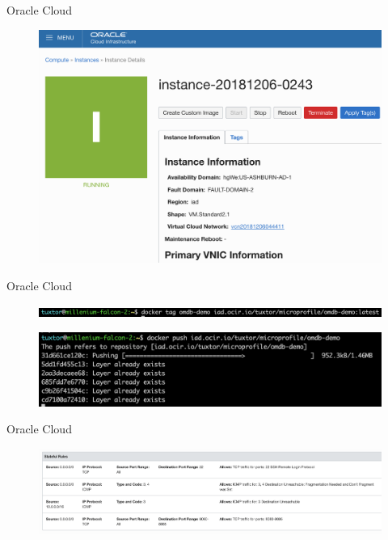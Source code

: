\documentclass{beamer}
\begin{document}
\begin{frame}{Oracle Cloud}
\begin{figure}
	\centering
	\includegraphics[width=0.95\linewidth]{Images/oc2}
\end{figure}
\end{frame}

\begin{frame}{Oracle Cloud}
\begin{figure}
	\centering
	\includegraphics[width=\linewidth]{Images/oc3}
\end{figure}

\begin{figure}
	\centering
	\includegraphics[width=\linewidth]{Images/oc4}
\end{figure}
\end{frame}

\begin{frame}{Oracle Cloud}

\begin{figure}
	\centering
	\includegraphics[width=\linewidth]{Images/oc5}
\end{figure}
\end{frame}
\end{document}
